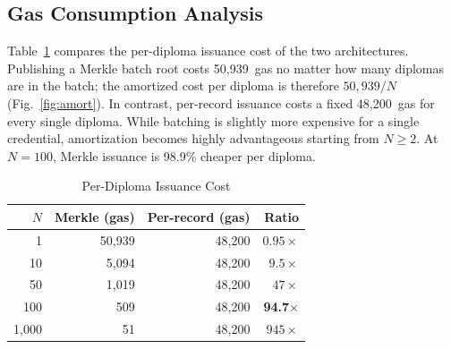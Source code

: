\documentclass[conference]{IEEEtran}
\renewcommand{\arraystretch}{1.08}
\begin{document}
\subsection{Gas Consumption Analysis}

Table~\ref{tab:amort} compares the per-diploma issuance cost of the 
two architectures. Publishing a Merkle batch root costs 50{,}939~gas 
no matter how many diplomas are in the batch; the amortized cost per 
diploma is therefore $50{,}939/N$ (Fig.~\ref{fig:amort}). In contrast, 
per-record issuance costs a fixed 48{,}200~gas for every single diploma. 
While batching is slightly more expensive for a single credential, 
amortization becomes highly advantageous starting from $N \geq 2$. 
At $N{=}100$, Merkle issuance is 98.9\% cheaper per diploma.

\begin{table}[tbp]
\centering
\caption{Per-Diploma Issuance Cost}
\label{tab:amort}
\renewcommand{\arraystretch}{1.12}
\footnotesize
\setlength{\tabcolsep}{5pt}
\begin{tabular}{rrrr}
\toprule
$N$ & \textbf{Merkle (gas)} &
  \textbf{Per-record (gas)} & \textbf{Ratio} \\
\midrule
1       & 50{,}939 & 48{,}200 & $0.95\times$ \\
10      & 5{,}094  & 48{,}200 & $9.5\times$  \\
50      & 1{,}019  & 48{,}200 & $47\times$   \\
100     & 509      & 48{,}200 & \textbf{94.7$\times$} \\
1{,}000 & 51       & 48{,}200 & $945\times$  \\
\bottomrule
\end{tabular}
\end{table}
\end{document}
